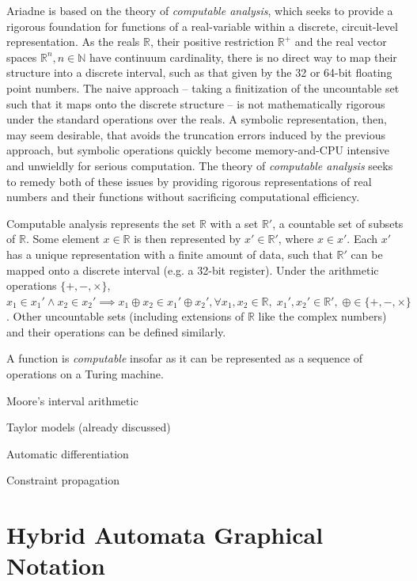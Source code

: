Ariadne is based on the theory of \textit{computable analysis}, which seeks to provide a rigorous foundation for functions of a real-variable within a discrete, circuit-level representation. As the reals $\mathbb{R}$, their positive restriction $\mathbb{R}^+$ and the real vector spaces $\mathbb{R}^n, n \in \mathbb{N}$ have continuum cardinality, there is no direct way to map their structure into a discrete interval, such as that given by the 32 or 64-bit floating point numbers.  The naive approach -- taking a finitization of the uncountable set such that it maps onto the discrete structure -- is not mathematically rigorous under the standard operations over the reals. A symbolic representation, then, may seem desirable, that avoids the truncation errors induced by the previous approach, but symbolic operations quickly become memory-and-CPU intensive and unwieldly for serious computation. The theory of \textit{computable analysis} seeks to remedy both of these issues by providing rigorous representations of real numbers and their functions without sacrificing computational efficiency.

Computable analysis represents the set $\mathbb{R}$ with a set $\mathbb{R}'$, a countable set of subsets of $\mathbb{R}$. Some element $x \in \mathbb{R}$ is then represented by $x' \in \mathbb{R}'$, where $x \in x'$. Each $x'$ has a unique representation with a finite amount of data, such that $\mathbb{R}'$ can be mapped  onto a discrete interval (e.g. a 32-bit register). Under the arithmetic operations $\{ +, -, \times \}$, $x_1 \in x_1' \land x_2 \in x_2' \implies x_1 \oplus x_2 \in x_1' \oplus x_2', \forall x_1, x_2 \in \mathbb{R}, \; x_1', x_2' \in \mathbb{R}', \; \oplus \in \{ +, -, \times \}$. Other uncountable sets (including extensions of $\mathbb{R}$ like the complex numbers) and their operations can be defined similarly.

A function is \textit{computable} insofar as it can be represented as a sequence of operations on a Turing machine.

Moore's interval arithmetic

Taylor models (already discussed)

Automatic differentiation

Constraint propagation

\section{Hybrid Automata Graphical Notation}

